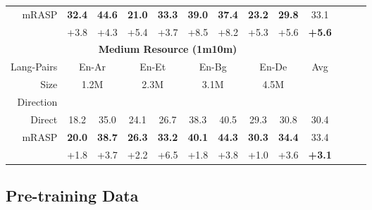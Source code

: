 \documentclass[11pt,a4paper]{article}
\newcommand{\mf}[1]{\multicolumn{2}{c}{ #1}}
\newcommand{\smf}[1]{\multicolumn{2}{c}{#1}}
\newcommand{\method}{mRASP\xspace}
\newcommand{\baseline}{Direct}
\begin{document}
\begin{table*}[htb]
\begin{center}
\begin{tabular}{rcccccccccccc}
 \method &
\bf 32.4 & \bf 44.6 &  \bf 21.0 & \bf 33.3 & \bf 39.0 & \bf 37.4 & \bf 23.2 & \bf 29.8 & 33.1

\\

 &
+3.8 & +4.3 &
+5.4 & +3.7  &
+8.5 & +8.2 &
+5.3 & +5.6 &
\textbf{+5.6}

\\

\midrule
\midrule
&\multicolumn{7}{c}{\textbf{Medium Resource (1m10m)}} \\
\midrule


Lang-Pairs & 
\mf{En-Ar} &
\mf{En-Et} &
\mf{En-Bg} &
\mf{En-De} &
Avg
\\



Size &
\smf{1.2M}  & \smf{2.3M} & \smf{3.1M} & \smf{4.5M}  

\\


Direction & 
  & &

  & &

  & &

  & \\



\midrule
 \baseline &
18.2 & 35.0 & 24.1 & 26.7 & 38.3 & 40.5 & 29.3 & 30.8 &  30.4
\\


 \method &
\bf 20.0 & \bf 38.7 & \bf 26.3 & \bf 33.2 & \bf 40.1 & \bf 44.3 & \bf 30.3 & \bf 34.4 & 33.4
\\

 &
+1.8 & +3.7 &
+2.2 & +6.5 &
+1.8 & +3.8 &
+1.0 & +3.6 &
\textbf{+3.1}

\\

\bottomrule
\end{tabular}
\caption{Fine-tuning performance on \emph{extremely low} / \emph{low} / \emph{medium} resource machine translation settings. The numbers in parentheses indicate the size of parallel corpus for fine-tuning.   
Pre-training with \method and then fine-tuning on downstream MT tasks consistently improves over MT models directly trained on bilingual parallel corpus. }
\label{tab:LowR}
\end{center}
\end{table*} 





\subsection{Pre-training Data}
\end{document}
